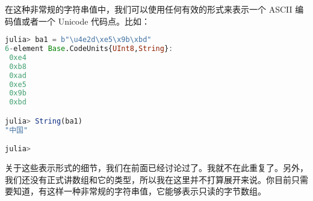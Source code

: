 在这种非常规的字符串值中，我们可以使用任何有效的形式来表示一个 ASCII 编码值或者一个 Unicode 代码点。比如：
\begin{lstlisting}[language=julia]
julia> ba1 = b"\u4e2d\xe5\x9b\xbd"
6-element Base.CodeUnits{UInt8,String}:
 0xe4
 0xb8
 0xad
 0xe5
 0x9b
 0xbd

julia> String(ba1)
"中国"

julia>
\end{lstlisting}

关于这些表示形式的细节，我们在前面已经讨论过了。我就不在此重复了。另外，我们还没有正式讲数组和它的类型，所以我在这里并不打算展开来说。你目前只需要知道，有这样一种非常规的字符串值，它能够表示只读的字节数组。